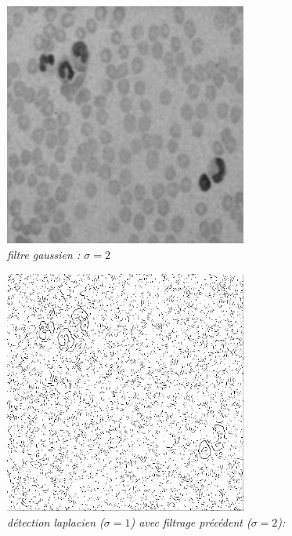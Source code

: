 \documentclass[a4,12pt]{article}
\begin{document}
\begin{center}
	\begin{minipage}[c]{0.49\linewidth}
		\begin{center}
			\includegraphics[width = 80mm]{./img/globulesbb26fg-2.jpg}\\
			\textit{filtre gaussien : $\sigma = 2$}\\
			\textit{}
		\end{center}
	\end{minipage}
	\begin{minipage}[c]{0.49\linewidth}
		\begin{center}
			\includegraphics[width = 80mm]{./img/globulesbb26fg-2-ctr-1.jpg}\\
			\textit{détection laplacien ($\sigma = 1$) avec filtrage précédent ($\sigma = 2$): }\\
		\end{center}
	\end{minipage}
\end{center}
\end{document}
